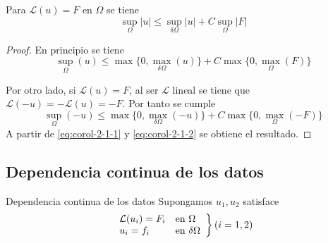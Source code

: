 \corol
Para $\mathcal{L}(u) = F$ en $\Omega$ se tiene
$$
\sup_{\Omega}|u| \le \sup_{\delta\Omega}|u|+C\sup_\Omega |F|
$$
\begin{proof}
En principio se tiene
\begin{equation}\label{eq:corol-2-1-1}
\sup_{\Omega}(u) \le \max\{0, \max_{\delta\Omega}(u)\}+C\max\{0,\max_\Omega (F)\}
\end{equation}

Por otro lado, si $\mathcal{L}(u) = F$, al ser $\mathcal{L}$ lineal se tiene que $\mathcal{L}(-u) = -\mathcal{L}(u) = -F$. Por tanto se cumple 
\begin{equation}\label{eq:corol-2-1-2}
\sup_{\Omega}(-u) \le \max\{0, \max_{\delta\Omega}(-u)\}+C\max\{0, \max_\Omega (-F)\}
\end{equation}
A partir de \eqref{eq:corol-2-1-1} y \eqref{eq:corol-2-1-2} se obtiene el resultado.
\end{proof}

\newpage
\subsection{Dependencia continua de los datos}
\begin{prop}{Dependencia continua de los datos}
Supongamos $u_1, u_2$ satisface 
\begin{equation*}
\left.
\begin{array}{l l}
\mathcal{L}(u_i)=F_i & \text{en } \Omega\\
u_i=f_i & \text{en } \delta\Omega\\
\end{array}
\right\} (i=1,2)
\end{equation*}
\end{prop}
